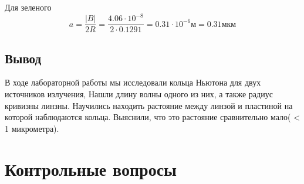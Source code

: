 \documentclass[14pt, a4paper, twoside]{extreport}
\begin{document}
Для зеленого
\begin{equation}
  a = \frac{|B|}{2R} = \frac{4.06 \cdot 10^{-8}}{2 \cdot 0.1291} = 0.31 \cdot 10^{-6} \text{м} = 0.31 \text{мкм}
\end{equation}

\section{Вывод}

В ходе лабораторной работы мы исследовали кольца Ньютона для двух источников излучения, Нашли длину волны одного из них, а также радиус кривизны линзны. Научились находить растояние между линзой и пластиной на которой наблюдаются кольца. Выяснили, что это растояние сравнительно мало( < 1 микрометра).

\chapter{Контрольные вопросы}
\end{document}
